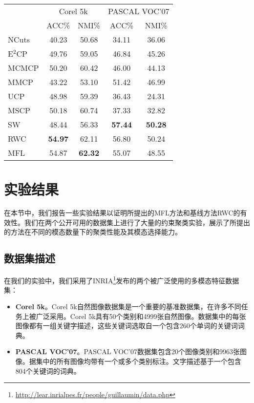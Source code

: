 \begin{table}[tb]
	\label{tab3:2modal}
	\centering
	\setlength{\tabcolsep}{15pt}
	\begin{tabular}{lcccc}
		\toprule
		&\multicolumn{2}{c}{Corel 5k} & \multicolumn{2}{c}{PASCAL VOC'07} \\
		\cmidrule(lr){2-3}
		\cmidrule(lr){4-5}
		& ACC\% & NMI\% & ACC\% & NMI\% \\
		\midrule
		NCuts & 40.23 & 50.68 & 34.11 & 36.06 \\ 
		E$^2$CP & 49.76 & 59.05 & 46.84 & 45.26 \\
		MCMCP & 50.20 & 60.42 & 46.00 & 44.13 \\  
		MMCP & 43.22 & 53.10 & 51.42 & 46.99 \\ 
		UCP & 48.98 & 59.39 & 36.43 & 24.31 \\ 
		MSCP & 50.18 & 60.74 & 37.33 & 32.82 \\ 
		\midrule
		SW & 48.44 & 56.33 & \textbf{57.44} & \textbf{50.28} \\ 
		RWC & \textbf{54.97} & 62.11 & 56.80 & 50.24 \\ 
		MFL & 54.87 & \textbf{62.32} & 55.07 & 48.55 \\ 
		\bottomrule
	\end{tabular}
\end{table}


\section{实验结果}
\label{sec3:exp}
在本节中，我们报告一些实验结果以证明所提出的MFL方法和基线方法RWC的有效性。我们在两个公开可用的数据集上进行了大量的约束聚类实验，展示了所提出的方法在不同的模态数量下的聚类性能及其模态选择能力。

\subsection{数据集描述}
在我们的实验中，我们采用了INRIA\footnote{\url{http://lear.inrialpes.fr/people/guillaumin/data.php}}发布的两个被广泛使用的多模态特征数据集\cite{guillaumin2009tagprop}：
\begin{itemize}
    \item {\textbf{Corel 5k}}。Corel 5k自然图像数据集是一个重要的基准数据集，在许多不同任务上被广泛采用。Corel 5k具有50个类别和4999张自然图像。数据集中的每张图像都有一组关键字描述，这些关键词选取自一个包含260个单词的关键词词典。
    \item {\textbf{PASCAL VOC'07}}。PASCAL VOC'07数据集\cite{pascal-voc-2007}包含20个图像类别和9963张图像。据集中的所有图像均带有一个或多个类别标注。文字描述基于一个包含804个关键词的词典。
\end{itemize}

